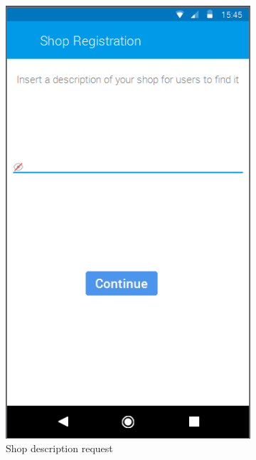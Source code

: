 \begin{figure}[h]
\centering
\begin{subfigure}{.5\textwidth}
  \centering
  \includegraphics[height=.4\textheight, keepaspectratio=true]{Img/Mockup_RegistrationShop2}
  \caption{Shop description request}
\end{subfigure}%
\begin{subfigure}{.5\textwidth}
  \centering

\end{subfigure}
\end{figure}
